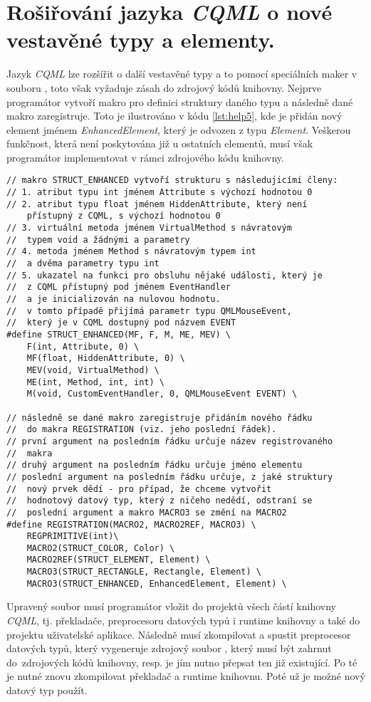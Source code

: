 \documentclass{article}
\begin{document}
\section[Rozšiřování \textit{CQML}]{\label{CH:APD}Rošiřování jazyka \textit{CQML} o nové vestavěné typy a elementy.}
Jazyk \textit{CQML} lze rozšířit o další vestavěné typy a to pomocí speciálních maker v souboru , toto však vyžaduje zásah do zdrojový kódů knihovny. Nejprve programátor vytvoří makro pro definici struktury daného typu a následně dané makro zaregistruje. Toto je ilustrováno v kódu \ref{lst:help5}, kde je přidán nový element jménem \textit{EnhancedElement}, který je odvozen z typu \textit{Element}. Veškerou funkčnost, která není poskytována již u ostatních elementů, musí však programátor implementovat v rámci zdrojového kódu knihovny.\\
\begin{lstlisting}[float, frame=single,caption=Registrace nového vestavěného datového typu.,label=lst:help5]
// makro STRUCT_ENHANCED vytvoří strukturu s následujicími členy:
// 1. atribut typu int jménem Attribute s výchozí hodnotou 0
// 2. atribut typu float jménem HiddenAttribute, který není 
	přístupný z CQML, s výchozí hodnotou 0
// 3. virtuální metoda jménem VirtualMethod s návratovým 
//	typem void a žádnými a parametry
// 4. metoda jménem Method s návratovým typem int 
//	a dvěma parametry typu int
// 5. ukazatel na funkci pro obsluhu nějaké události, který je
//	z CQML přístupný pod jménem EventHandler
//	a je inicializován na nulovou hodnotu. 
//	v tomto případě přijímá parametr typu QMLMouseEvent, 
//	který je v CQML dostupný pod názvem EVENT
#define STRUCT_ENHANCED(MF, F, M, ME, MEV) \
	F(int, Attribute, 0) \
	MF(float, HiddenAttribute, 0) \
	MEV(void, VirtualMethod) \
	ME(int, Method, int, int) \
	M(void, CustomEventHandler, 0, QMLMouseEvent EVENT) \

// následně se dané makro zaregistruje přidáním nového řádku 
// 	do makra REGISTRATION (viz. jeho poslední řádek).
// první argument na posledním řádku určuje název registrovaného
//	makra
// druhý argument na posledním řádku určuje jméno elementu
// poslední argument na posledním řádku určuje, z jaké struktury
//	nový prvek dědí - pro případ, že chceme vytvořit
//	hodnotový datový typ, který z ničeho nedědí, odstraní se 
//	poslední argument a makro MACRO3 se změní na MACRO2
#define REGISTRATION(MACRO2, MACRO2REF, MACRO3) \
	REGPRIMITIVE(int)\
	MACRO2(STRUCT_COLOR, Color) \
	MACRO2REF(STRUCT_ELEMENT, Element) \
	MACRO3(STRUCT_RECTANGLE, Rectangle, Element) \
	MACRO3(STRUCT_ENHANCED, EnhancedElement, Element) \ 
\end{lstlisting}
Upravený soubor \uv{struct\_definition\_macros.h} musí programátor vložit do projektů všech částí knihovny \textit{CQML}, tj. překladače, preprocesoru datových typů i runtime knihovny a také do projektu uživatelské aplikace. Následně musí zkompilovat a spustit preprocesor datových typů, který vygeneruje zdrojový soubor , který musí být zahrnut do~zdrojových kódů knihovny, resp. je jím nutno přepsat ten již existující. Po té je nutné znovu zkompilovat překladač a runtime knihovnu. Poté už je možné nový datový typ použít.
\end{document}
